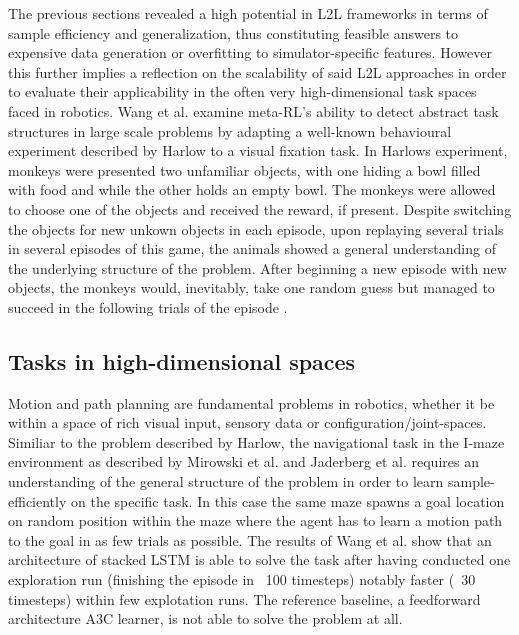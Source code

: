 \documentclass[letterpaper, 10 pt, conference]{ieeeconf}  %
\begin{document}
The previous sections revealed a high potential in L2L frameworks in terms of sample efficiency and generalization, thus constituting 
feasible answers to expensive data generation or overfitting to simulator-specific features. However this further implies a 
reflection on the scalability of said L2L approaches in order to evaluate their applicability in the often very
high-dimensional task spaces faced in robotics. \newline
Wang et al.\cite{wangLearningReinforcementLearn2016} examine meta-RL's ability to detect abstract task 
structures in large scale problems by adapting a well-known behavioural experiment 
described by Harlow \cite{harlowFormationLearningSets1949} to a visual fixation task. In Harlows experiment, 
monkeys were presented two unfamiliar objects, with one 
hiding a bowl filled with food and while the other holds an empty bowl. The monkeys were allowed to choose one
 of the objects and received the reward, if present. 
Despite switching the objects for new unkown objects in each episode, upon replaying several trials in 
several episodes of this game, the animals showed
a general understanding of the underlying structure of the problem. After beginning a new episode with new objects, 
the monkeys would, inevitably, take 
one random guess but managed to succeed in the following trials of the episode \cite{botvinickReinforcementLearningFast2019}. \newline

\subsection{Tasks in high-dimensional spaces}

Motion and path planning are fundamental problems in robotics, whether it be within a space of rich visual input, sensory data or
configuration/joint-spaces. Similiar to the problem described by Harlow, the navigational task in the I-maze environment as described by 
Mirowski et al.\cite{mirowskiLearningNavigateComplex2016} and Jaderberg et al.\cite{jaderbergReinforcementLearningUnsupervised2016} 
requires an understanding of the general structure of the problem in order to learn sample-efficiently 
on the specific task. In this case the same maze spawns a goal location on random position within the maze where the agent has to learn
a motion path to the goal in as few trials as possible. The results of Wang et al.\cite{wangLearningReinforcementLearn2016}
 show that an architecture of stacked LSTM is able to 
solve the task after having conducted one exploration run (finishing the episode in ~100 timesteps) notably faster (~30 timesteps) within few
explotation runs. The reference baseline, a feedforward architecture A3C learner, is not able to solve the problem at all. 
 
\end{document}
